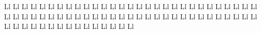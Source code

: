 \documentclass{worksheet}
\begin{document}
\begin{drillsheet}
\calligra
Ll Ll Ll Ll Ll Ll Ll Ll Ll Ll Ll Ll Ll Ll Ll Ll Ll Ll Ll Ll Ll Ll Ll Ll Ll Ll Ll Ll Ll Ll Ll Ll Ll Ll Ll Ll Ll Ll Ll Ll Ll Ll Ll Ll Ll Ll Ll Ll Ll Ll Ll Ll Ll Ll Ll Ll Ll Ll Ll Ll Ll Ll Ll Ll Ll Ll Ll Ll Ll Ll Ll Ll Ll
\end{drillsheet}
\end{document}
